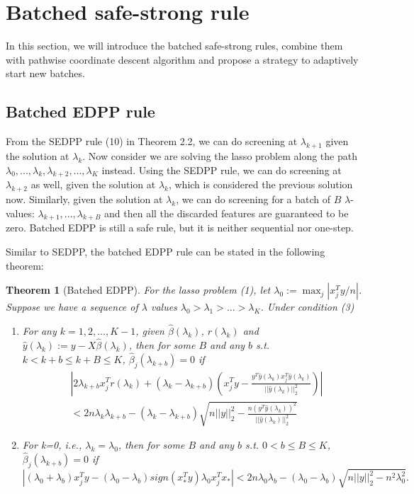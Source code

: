 \documentclass{article}
\newtheorem{theorem}{Theorem}[section]
\begin{document}
\section{Batched safe-strong rule}
\label{sec:method}

In this section, we will introduce the batched safe-strong rules, combine them with pathwise coordinate descent algorithm and propose a strategy to adaptively start new batches.

\subsection{Batched EDPP rule}

From the SEDPP rule (10) in Theorem 2.2, we can do screening at $\lambda_{k+1}$ given the solution at $\lambda_k$. Now consider we are solving the lasso problem along the path $\lambda_0,...,\lambda_k,\lambda_{k+2},...,\lambda_K$ instead. Using the SEDPP rule, we can do screening at $\lambda_{k+2}$ as well, given the solution at $\lambda_k$, which is considered the previous solution now. Similarly, given the solution at $\lambda_k$, we can do screening for a batch of $B$ $\lambda$-values: $\lambda_{k+1},...,\lambda_{k+B}$ and then all the discarded features are guaranteed to be zero. Batched EDPP is still a safe rule, but it is neither sequential nor one-step.

Similar to SEDPP, the batched EDPP rule can be stated in the following theorem:

\begin{theorem}[Batched EDPP]
    For the lasso problem (1), let $\lambda_0:=\max_j|x_j^Ty/n|$. Suppose we have a sequence of $\lambda$ values $\lambda_0>\lambda_1>...>\lambda_K$. Under condition (3)
    \begin{enumerate}
        \item For any $k=1,2,...,K-1$, given $\hat{\beta}(\lambda_k)$, $r(\lambda_k)$ and $\hat{y}(\lambda_k):=y-X\hat{\beta}(\lambda_k)$, then for some $B$ and any $b$ s.t. $k<k+b\leq k+B\leq K$, $\hat{\beta}_j(\lambda_{k+b})=0$ if
        \begin{equation}
            \begin{split}
                &\left|2\lambda_{k+b}x_j^Tr(\lambda_k)+(\lambda_k-\lambda_{k+b})\left( x_j^Ty-\frac{y^T\hat{y}(\lambda_k)x_j^T\hat{y}(\lambda_k)}{||\hat{y}(\lambda_k)||_2^2}\right)\right|\\&<2n\lambda_k\lambda_{k+b}-(\lambda_k-\lambda_{k+b})\sqrt{n||y||_2^2-\frac{n(y^T\hat{y}(\lambda_k))^2}{||\hat{y}(\lambda_k)||_2^2}}
            \end{split}
        \end{equation}
        \item For k=0, i.e., $\lambda_k=\lambda_0$, then for some $B$ and any $b$ s.t. $0<b\leq B\leq K$, $\hat{\beta}_j(\lambda_{k+b})=0$ if
        \begin{equation}
        |(\lambda_0+\lambda_b)x_j^Ty-(\lambda_0-\lambda_b)sign(x_*^Ty)\lambda_0x_j^Tx_*|<2n\lambda_0\lambda_b-(\lambda_0-\lambda_b)\sqrt{n||y||_2^2-n^2\lambda_0^2}.
    \end{equation}
    \end{enumerate}
\end{theorem}
\end{document}
